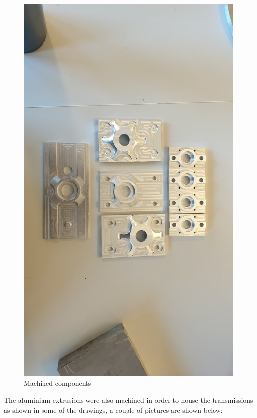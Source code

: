 \begin{figure}[H]
	\centering
	\includegraphics[width=\textwidth]{4-experiment-design/img/mechanical/mach-flanges.jpg}
	\caption{Machined components}
	\label{fig::mechanical::machined_flanges}
\end{figure}

The aluminium extrusions were also machined in order to house the transmissions as shown in some of the drawings, a couple of pictures are shown below:

